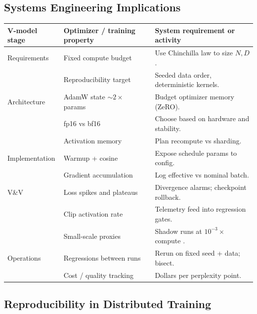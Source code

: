 \subsection{Systems Engineering Implications}

\begin{center}
\begin{tabular}{|p{3.4cm}|p{3.4cm}|p{6.8cm}|}
\hline
V-model stage & Optimizer / training property & System requirement or activity \\
\hline
Requirements & Fixed compute budget & Use Chinchilla law to size $N, D$. \\
 & Reproducibility target & Seeded data order, deterministic kernels. \\
\hline
Architecture & AdamW state $\sim 2\times$ params & Budget optimizer memory (ZeRO). \\
 & fp16 vs bf16 & Choose based on hardware and stability. \\
 & Activation memory & Plan recompute vs sharding. \\
\hline
Implementation & Warmup + cosine & Expose schedule params to config. \\
 & Gradient accumulation & Log effective vs nominal batch. \\
\hline
V\&V & Loss spikes and plateaus & Divergence alarms; checkpoint rollback. \\
 & Clip activation rate & Telemetry feed into regression gates. \\
 & Small-scale proxies & Shadow runs at $10^{-3}\times$ compute
   \citep{wortsman2023stable}. \\
\hline
Operations & Regressions between runs & Rerun on fixed seed + data; bisect. \\
 & Cost / quality tracking & Dollars per perplexity point. \\
\hline
\end{tabular}
\end{center}

\subsection{Reproducibility in Distributed Training}

